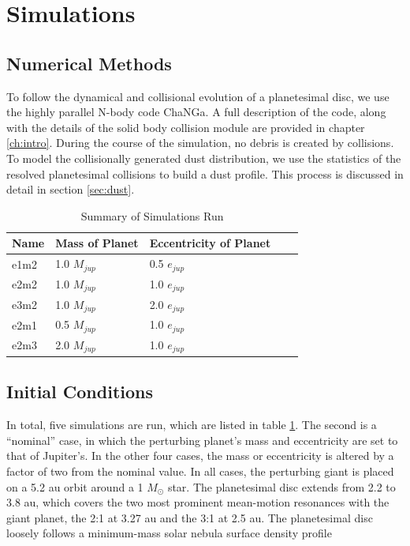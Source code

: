 \section{Simulations} \label{sec:sims}

\subsection{Numerical Methods}\label{sec:methods}

To follow the dynamical and collisional evolution of a planetesimal disc, we use the highly parallel N-body code {\sc ChaNGa}. A full 
description of the code, along with the details of the solid body collision module are provided in chapter \ref{ch:intro}. During the course 
of the simulation, no debris is created by collisions. To model the collisionally generated dust distribution, we use the statistics of the 
resolved planetesimal collisions to build a dust profile. This process is discussed in detail in section \ref{sec:dust}.

\begin{table}
\begin{center}
\caption{Summary of Simulations Run}
\begin{tabular}{lllll} \hline \hline
Name     & Mass of Planet & Eccentricity of Planet &  &  \\ \hline
e1m2 & 1.0 $M_{jup}$                     & 0.5 $e_{jup}$                            &  &  \\
e2m2      & 1.0 $M_{jup}$                     & 1.0 $e_{jup}$                             &  &  \\
e3m2 & 1.0 $M_{jup}$                     & 2.0 $e_{jup}$                             &  &  \\
e2m1 & 0.5 $M_{jup}$                   & 1.0 $e_{jup}$                             &  &  \\
e2m3 & 2.0 $M_{jup}$                     & 1.0 $e_{jup}$                             &  &  \\ \hline
\end{tabular}
\label{tab:sims}
\end{center}
\end{table}

\subsection{Initial Conditions}\label{sec:jup_ics}

In total, five simulations are run, which are listed in table \ref{tab:sims}. The second is a ``nominal'' case, in which the perturbing 
planet's mass and eccentricity are set to that of Jupiter's. In the other four cases, the mass or eccentricity is altered by a factor of 
two from the nominal value. In all cases, the perturbing giant is placed on a 5.2 au orbit around a 1 $M_{\odot}$ star. The 
planetesimal disc extends from 2.2 to 3.8 au, which covers the two most prominent mean-motion resonances with the giant 
planet, the 2:1 at 3.27 au and the 3:1 at 2.5 au. The planetesimal disc loosely follows a minimum-mass solar nebula surface 
density profile \cite{hayashi81}

